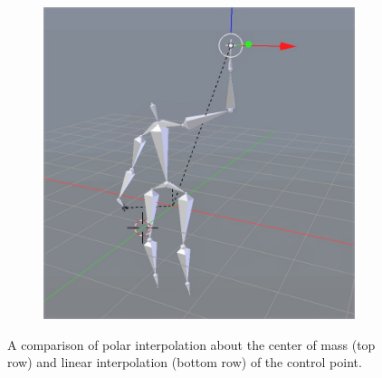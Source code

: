 \documentclass[10pt,twocolumn,letterpaper]{article}
\begin{document}
\begin{figure}[]
\begin{subfigure}{0.2\textwidth}
        \centering
        \includegraphics[width=.9\linewidth]{raise-linear-4.jpg}
    \end{subfigure}

    \caption{A comparison of polar interpolation about the center of mass (top row) and linear interpolation (bottom row) of the control point.}
    \label{img:raise}
\end{figure}
\end{document}
